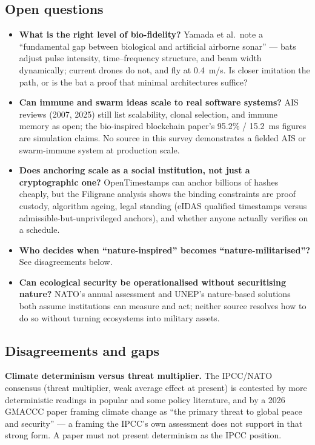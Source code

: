 \documentclass[11pt]{article}
\begin{document}
\subsection{Open questions}

\begin{itemize}
\item \textbf{What is the right level of bio-fidelity?} Yamada et al.\
note a ``fundamental gap between biological and artificial airborne
sonar'' --- bats adjust pulse intensity, time--frequency structure, and
beam width dynamically; current drones do not, and fly at 0.4~m/s. Is
closer imitation the path, or is the bat a proof that minimal
architectures suffice?
\item \textbf{Can immune and swarm ideas scale to real software
systems?} AIS reviews (2007, 2025) still list scalability, clonal
selection, and immune memory as open; the bio-inspired blockchain
paper's 95.2\% / 15.2~ms figures are simulation claims. No source in
this survey demonstrates a fielded AIS or swarm-immune system at
production scale.
\item \textbf{Does anchoring scale as a social institution, not just a
cryptographic one?} OpenTimestamps can anchor billions of hashes
cheaply, but the Filigrane analysis shows the binding constraints are
proof custody, algorithm ageing, legal standing (eIDAS qualified
timestamps versus admissible-but-unprivileged anchors), and whether
anyone actually verifies on a schedule.
\item \textbf{Who decides when ``nature-inspired'' becomes
``nature-militarised''?} See disagreements below.
\item \textbf{Can ecological security be operationalised without
securitising nature?} NATO's annual assessment and UNEP's nature-based
solutions both assume institutions can measure and act; neither source
resolves how to do so without turning ecosystems into military assets.
\end{itemize}

\subsection{Disagreements and gaps}

\textbf{Climate determinism versus threat multiplier.} The IPCC/NATO
consensus (threat multiplier, weak average effect at present) is
contested by more deterministic readings in popular and some policy
literature, and by a 2026 GMACCC paper framing climate change as ``the
primary threat to global peace and security'' --- a framing the IPCC's
own assessment does not support in that strong form. A paper must not
present determinism as the IPCC position.
\end{document}
